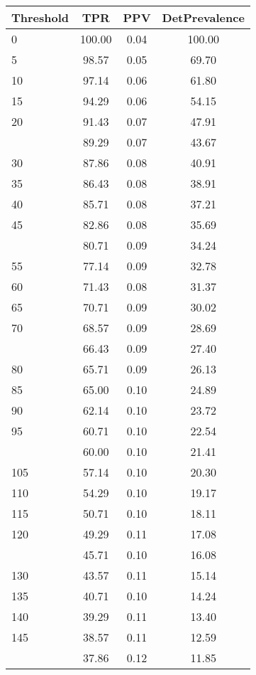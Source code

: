 \begin{table}[ht]
\centering
\begin{tabular}{lccc}
  \toprule
Threshold & TPR & PPV & DetPrevalence \\ 
  \midrule
0 & 100.00 & 0.04 & 100.00 \\ 
  5 & 98.57 & 0.05 & 69.70 \\ 
  10 & 97.14 & 0.06 & 61.80 \\ 
  15 & 94.29 & 0.06 & 54.15 \\ 
  20 & 91.43 & 0.07 & 47.91 \\ 
   \addlinespace
25 & 89.29 & 0.07 & 43.67 \\ 
  30 & 87.86 & 0.08 & 40.91 \\ 
  35 & 86.43 & 0.08 & 38.91 \\ 
  40 & 85.71 & 0.08 & 37.21 \\ 
  45 & 82.86 & 0.08 & 35.69 \\ 
   \addlinespace
50 & 80.71 & 0.09 & 34.24 \\ 
  55 & 77.14 & 0.09 & 32.78 \\ 
  60 & 71.43 & 0.08 & 31.37 \\ 
  65 & 70.71 & 0.09 & 30.02 \\ 
  70 & 68.57 & 0.09 & 28.69 \\ 
   \addlinespace
75 & 66.43 & 0.09 & 27.40 \\ 
  80 & 65.71 & 0.09 & 26.13 \\ 
  85 & 65.00 & 0.10 & 24.89 \\ 
  90 & 62.14 & 0.10 & 23.72 \\ 
  95 & 60.71 & 0.10 & 22.54 \\ 
   \addlinespace
100 & 60.00 & 0.10 & 21.41 \\ 
  105 & 57.14 & 0.10 & 20.30 \\ 
  110 & 54.29 & 0.10 & 19.17 \\ 
  115 & 50.71 & 0.10 & 18.11 \\ 
  120 & 49.29 & 0.11 & 17.08 \\ 
   \addlinespace
125 & 45.71 & 0.10 & 16.08 \\ 
  130 & 43.57 & 0.11 & 15.14 \\ 
  135 & 40.71 & 0.10 & 14.24 \\ 
  140 & 39.29 & 0.11 & 13.40 \\ 
  145 & 38.57 & 0.11 & 12.59 \\ 
   \addlinespace
150 & 37.86 & 0.12 & 11.85 \\ 

\end{tabular}
\end{table}
